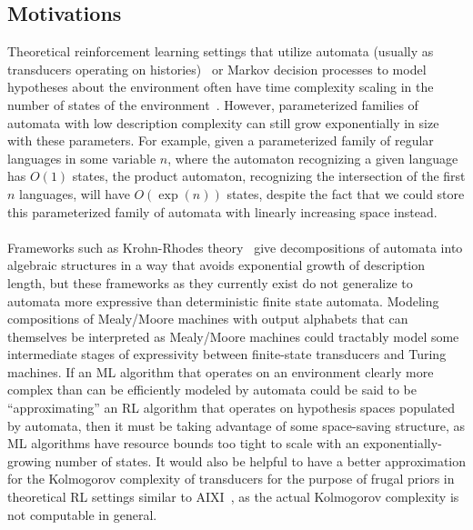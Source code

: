 \documentclass{article}
\theoremstyle{definition}
\theoremstyle{remark}
\begin{document}
\subsection{Motivations}
Theoretical reinforcement learning settings that utilize
automata (usually as transducers operating on 
histories)~\cite{ronca2022efficient} or Markov decision
processes to model
hypotheses about the environment often have time complexity
scaling in the number of states of the
environment~\cite{kearns1995computational}. However,
parameterized families of
automata with low description complexity can still grow exponentially
in size with these parameters. For example, given a parameterized
family of regular languages in some variable $n$, where the automaton
recognizing a given language has $O(1)$ states, the product automaton,
recognizing the intersection of the first $n$ languages, will have
$O(\exp(n))$ states, despite the fact that we could store this
parameterized family of automata with linearly increasing space
instead.
\\\\
Frameworks such as Krohn-Rhodes theory~\cite{krohn1965algebraic}
give decompositions of automata into algebraic structures in a way
that avoids exponential
growth of description
length, but these frameworks as they currently exist
do not generalize to automata more expressive
than deterministic finite state automata. Modeling
compositions of Mealy/Moore
machines with output alphabets that can themselves be interpreted
as Mealy/Moore machines could tractably model some intermediate
stages of expressivity between finite-state transducers and
Turing machines.
If an ML algorithm that operates
on an environment clearly more complex than can be
efficiently modeled by automata could be said to be ``approximating'' an
RL algorithm that operates on hypothesis spaces populated by automata,
then it must be taking advantage of some space-saving structure, as
ML algorithms have resource bounds too tight to scale with an
exponentially-growing number of states. It
would also be helpful to have a better approximation for
the Kolmogorov complexity of transducers for the purpose
of frugal priors in theoretical RL settings
similar to AIXI~\cite{hutter2000theory}, as the actual Kolmogorov
complexity is not computable in general.
\end{document}
